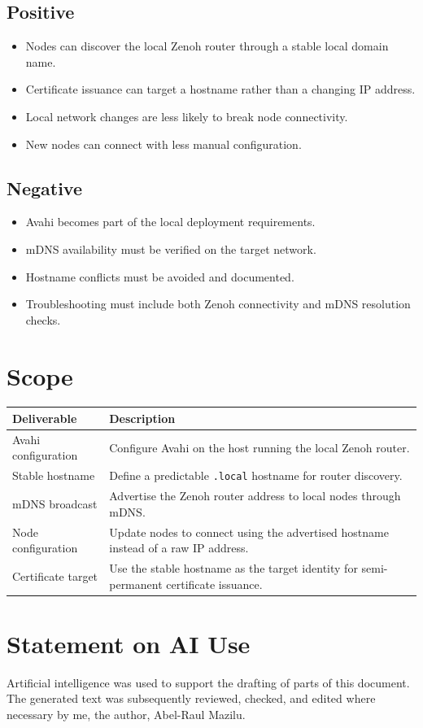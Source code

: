 \documentclass[11pt]{article}
\begin{document}
\subsection{Positive}

\begin{itemize}
    \item Nodes can discover the local Zenoh router through a stable local domain name.
    \item Certificate issuance can target a hostname rather than a changing IP address.
    \item Local network changes are less likely to break node connectivity.
    \item New nodes can connect with less manual configuration.
\end{itemize}

\subsection{Negative}

\begin{itemize}
    \item Avahi becomes part of the local deployment requirements.
    \item mDNS availability must be verified on the target network.
    \item Hostname conflicts must be avoided and documented.
    \item Troubleshooting must include both Zenoh connectivity and mDNS resolution checks.
\end{itemize}

\section{Scope}

\begin{table}[ht]
\centering
\renewcommand{\arraystretch}{1.25}
\begin{tabular}{L{0.32\textwidth} L{0.58\textwidth}}
\toprule
\textbf{Deliverable} & \textbf{Description} \\
\midrule
Avahi configuration & Configure Avahi on the host running the local Zenoh router. \\
Stable hostname & Define a predictable \texttt{.local} hostname for router discovery. \\
mDNS broadcast & Advertise the Zenoh router address to local nodes through mDNS. \\
Node configuration & Update nodes to connect using the advertised hostname instead of a raw IP address. \\
Certificate target & Use the stable hostname as the target identity for semi-permanent certificate issuance. \\
\bottomrule
\end{tabular}
\end{table}

\newpage

\section*{Statement on AI Use}

Artificial intelligence was used to support the drafting of parts of this document. The generated text was subsequently reviewed, checked, and edited where necessary by me, the author, Abel-Raul Mazilu.
\end{document}
